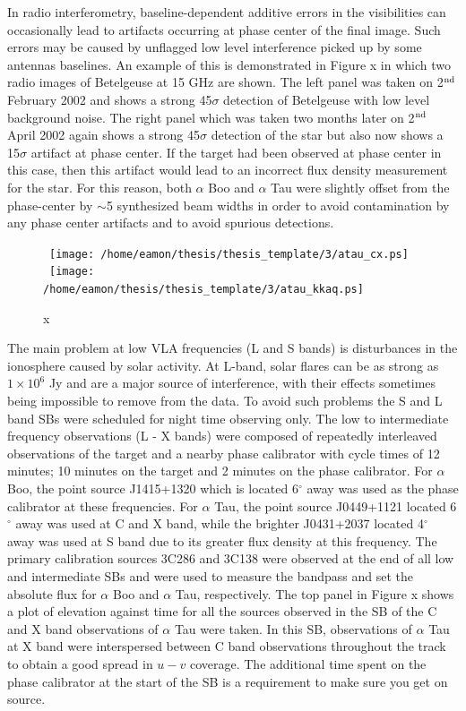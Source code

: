 In radio interferometry, baseline-dependent additive errors in the visibilities can occasionally lead to artifacts occurring at phase center of the final image. Such errors may be caused by unflagged low level interference picked up by some antennas baselines. An example of this is demonstrated in Figure x in which two radio images of Betelgeuse at 15 GHz are shown. The left panel was taken on 2$^{\rm{nd}}$ February 2002 and shows a strong 45$\sigma$ detection of Betelgeuse with low level background noise. The right panel which was taken two months later on 2$^{\rm{nd}}$ April 2002 again shows a strong 45$\sigma$ detection of the star but also now shows a 15$\sigma$ artifact at phase center. If the target had been observed at phase center in this case, then this artifact would lead to an incorrect flux density measurement for the star. For this reason, both $\alpha$ Boo and $\alpha$ Tau were slightly offset from the phase-center by $\sim$5 synthesized beam widths in order to avoid contamination by any phase center artifacts and to avoid spurious detections. 

\begin{figure}[hbt!]
\centering 
\mbox{
          \texttt{[image: /home/eamon/thesis/thesis\_template/3/atau\_cx.ps]}}
\mbox{
          \texttt{[image: /home/eamon/thesis/thesis\_template/3/atau\_kkaq.ps]}
          }
\caption[x]{x}
\label{}
\end{figure}

The main problem at low VLA frequencies (L and S bands) is disturbances in the ionosphere caused by solar activity. At L-band, solar flares can be as strong as $1 \times 10^6$ Jy and are a major source of interference, with their effects sometimes being impossible to remove from the data. To avoid such problems the S and L band SBs were scheduled for night time observing only. The low to intermediate frequency observations (L - X bands) were composed of repeatedly interleaved observations of the target and a nearby phase calibrator with cycle times of 12 minutes; 10 minutes on the target and 2 minutes on the phase calibrator. For $\alpha$ Boo, the point source J1415+1320 which is located 6$^{\circ}$ away was used as the phase calibrator at these frequencies. For $\alpha$ Tau, the point source J0449+1121 located 6$^{\circ}$ away was used at C and X band, while the brighter J0431+2037 located 4$^{\circ}$ away was used at S band due to its greater flux density at this frequency. The primary calibration sources 3C286 and 3C138 were observed at the end of all low and intermediate SBs and were used to measure the bandpass and set the absolute flux for $\alpha$ Boo and $\alpha$ Tau, respectively. The top panel in Figure x shows a plot of elevation against time for all the sources observed in the SB of the C and X band observations of $\alpha$ Tau were taken. In this SB, observations of $\alpha$ Tau at X band were interspersed between C band observations throughout the track to obtain a good spread in $u-v$ coverage. The additional time spent on the phase calibrator at the start of the SB is a requirement to make sure you get on source. 

